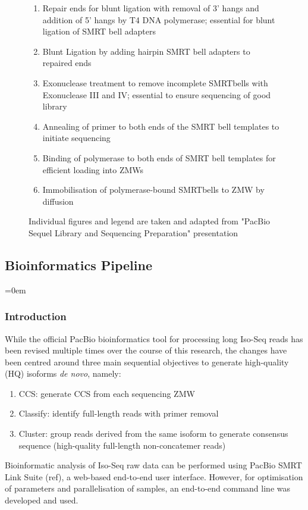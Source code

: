 \begin{figure}[!htp]
{\begin{enumerate}
			\item Repair ends for blunt ligation with removal of 3' hangs and addition of 5' hangs by T4 DNA polymerase; essential for blunt ligation of SMRT bell adapters 
			\item Blunt Ligation by adding hairpin SMRT bell adapters to repaired ends
			\item Exonuclease treatment to remove incomplete SMRTbells with Exonuclease III and IV; essential to ensure sequencing of good library 
			\item Annealing of primer to both ends of the SMRT bell templates to initiate sequencing 
			\item Binding of polymerase to both ends of SMRT bell templates for efficient loading into ZMWs
			\item Immobilisation of polymerase-bound SMRTbells to ZMW by diffusion
			\\
		\end{enumerate} 
		Individual figures and legend are taken and adapted from "PacBio Sequel Library and Sequencing Preparation" presentation
	}
	\label{fig:isoseq_labworkflow}
\end{figure}

\subsection{Bioinformatics Pipeline} 
\label{section:isoseq_bioinformatics}

\begingroup
\parindent=0em
\localtableofcontents 
\endgroup

\subsubsection{Introduction}
While the official PacBio bioinformatics tool for processing long Iso-Seq reads has been revised multiple times over the course of this research, the changes have been centred around three main sequential objectives to generate high-quality (HQ) isoforms \textit{de novo}, namely: 
\begin{enumerate}
	\item CCS: generate CCS from each sequencing ZMW
	\item Classify: identify full-length reads with primer removal
	\item Cluster: group reads derived from the same isoform to generate consensus sequence (high-quality full-length non-concatemer reads)	
\end{enumerate}
Bioinformatic analysis of Iso-Seq raw data can be performed using PacBio SMRT Link Suite (ref), a web-based end-to-end user interface. However, for optimisation of parameters and parallelisation of samples, an end-to-end command line was developed and used.  

